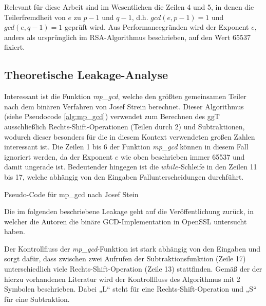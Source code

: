 Relevant für diese Arbeit sind im Wesentlichen die Zeilen 4 und 5, in denen die Teilerfremdheit von $e$ zu $p-1$ und $q-1$, d.h. $gcd(e,p-1) = 1$ und $gcd(e,q-1) = 1$ geprüft wird.
Aus Performancegründen wird der Exponent $e$, anders als ursprünglich im RSA-Algorithmus beschrieben, auf den Wert 65537 fixiert.

\subsection{Theoretische Leakage-Analyse}

Interessant ist die Funktion \textit{mp_gcd}, welche den größten gemeinsamen Teiler nach dem binären Verfahren von Josef Strein \cite{SteinBinaryGCD} berechnet. 
Dieser Algorithmus (siehe Pseudocode \ref{alg:mp_gcd}) verwendet zum Berechnen des ggT ausschließlich Rechts-Shift-Operationen (Teilen durch 2) und Subtraktionen, wodurch dieser besonders für die in diesem Kontext verwendeten großen Zahlen interessant ist.
Die Zeilen 1 bis 6 der Funktion \textit{mp_gcd} können in diesem Fall ignoriert werden, da der Exponent $e$ wie oben beschrieben immer 65537 und damit ungerade ist. 
Bedeutender hingegen ist die $while$-Schleife in den Zeilen 11 bis 17, welche abhängig von den Eingaben Fallunterscheidungen durchführt. 

\begin{algorithm}[h]
\DontPrintSemicolon
\caption{Pseudo-Code für mp_gcd nach Josef Stein}
\label{alg:mp_gcd}

\end{algorithm}

Die im folgenden beschriebene Leakage geht auf die Veröffentlichung \cite{RSAKeyGeneration2} zurück, in welcher die Autoren die binäre GCD-Implementation in OpenSSL untersucht haben.

Der Kontrollfluss der \textit{mp_gcd}-Funktion ist stark abhängig von den Eingaben und sorgt dafür, dass zwischen zwei Aufrufen der Subtraktionsfunktion (Zeile 17) unterschiedlich viele Rechts-Shift-Operation (Zeile 13) stattfinden.
Gemäß der der hierzu vorhandenen Literatur \cite{ShiftSubtractionDescription} wird der Kontrollfluss des Algorithmus mit 2 Symbolen beschrieben.
Dabei „L“ steht für eine Rechts-Shift-Operation und „S“ für eine Subtraktion.

